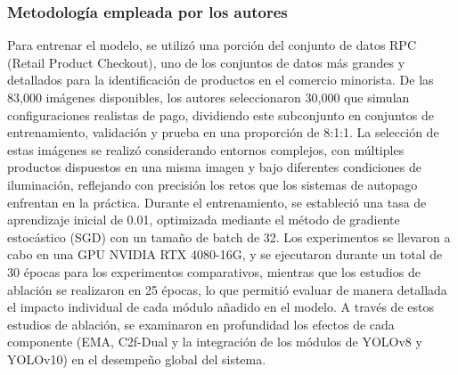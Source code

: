 \subsubsection{Metodología empleada por los autores}
Para entrenar el modelo, se utilizó una porción del conjunto de datos RPC (Retail Product Checkout), uno de los conjuntos de datos más grandes y detallados para la identificación de productos en el comercio minorista. De las 83,000 imágenes disponibles, los autores seleccionaron 30,000 que simulan configuraciones realistas de pago, dividiendo este subconjunto en conjuntos de entrenamiento, validación y prueba en una proporción de 8:1:1. La selección de estas imágenes se realizó considerando entornos complejos, con múltiples productos dispuestos en una misma imagen y bajo diferentes condiciones de iluminación, reflejando con precisión los retos que los sistemas de autopago enfrentan en la práctica. Durante el entrenamiento, se estableció una tasa de aprendizaje inicial de 0.01, optimizada mediante el método de gradiente estocástico (SGD) con un tamaño de batch de 32. Los experimentos se llevaron a cabo en una GPU NVIDIA RTX 4080-16G, y se ejecutaron durante un total de 30 épocas para los experimentos comparativos, mientras que los estudios de ablación se realizaron en 25 épocas, lo que permitió evaluar de manera detallada el impacto individual de cada módulo añadido en el modelo. A través de estos estudios de ablación, se examinaron en profundidad los efectos de cada componente (EMA, C2f-Dual y la integración de los módulos de YOLOv8 y YOLOv10) en el desempeño global del sistema.






